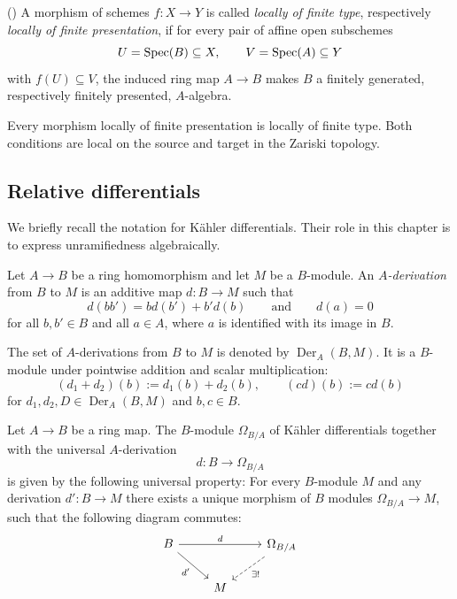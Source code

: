 \begin{definition}\label{def:lft-lfp}
	(\cite[][Tags 01T2, 01TQ]{stacks-project})
	A morphism of schemes $f:X\to Y$ is called
	\emph{locally of finite type}, respectively
	\emph{locally of finite presentation}, if for every
	pair of affine open subschemes
	\[
	U=\operatorname{Spec}\!\left(B\right)\subseteq X,
	\qquad
	V=\operatorname{Spec}\!\left(A\right)\subseteq Y
	\]
	with $f(U)\subseteq V$, the induced ring map $A\to B$
	makes $B$ a finitely generated, respectively finitely
	presented, $A$-algebra.
\end{definition}

\begin{remark}
	Every morphism locally of finite presentation is locally
	of finite type. Both conditions are local on the source
	and target in the Zariski topology.
\end{remark}

\subsection{Relative differentials}

We briefly recall the notation for K\"ahler differentials.
Their role in this chapter is to express unramifiedness
algebraically.

\begin{definition}
	Let $A \to B$ be a ring homomorphism and let $M$ be a
	$B$-module. An \emph{$A$-derivation} from $B$ to $M$ is an
	additive map $d:B\to M$ such that
	\[
	d(bb')=bd(b')+b'd(b)
	\qquad\text{and}\qquad
	d(a)=0
	\]
	for all $b,b'\in B$ and all $a\in A$, where $a$ is identified
	with its image in $B$.
	
	The set of $A$-derivations from $B$ to $M$ is denoted by
	$\operatorname{Der}_A(B,M)$. It is a $B$-module under pointwise
	addition and scalar multiplication:
	\[
	(d_1+d_2)(b):=d_1(b)+d_2(b),
	\qquad
	(cd)(b):=cd(b)
	\]
	for $d_1,d_2,D\in\operatorname{Der}_A(B,M)$ and $b,c\in B$.
\end{definition}

\begin{definition}
	Let $A\to B$ be a ring map. The $B$-module $\Omega_{B/A}$ of K\"ahler differentials together with the universal $A$-derivation
	\[
	d:B\longrightarrow\Omega_{B/A}
	\]
	is given by the following universal property: For every $B$-module $M$ and any derivation $d': B \to M$ there exists a unique morphism of $B$ modules $\Omega_{B/A} \to M$, such that the following diagram commutes:
	\[\begin{tikzcd}
		B && {\Omega_{B/A}} \\
		& M
		\arrow["d", from=1-1, to=1-3]
		\arrow["{d'}"', from=1-1, to=2-2]
		\arrow["{\exists!}", dashed, from=1-3, to=2-2]
	\end{tikzcd}\]
\end{definition}

